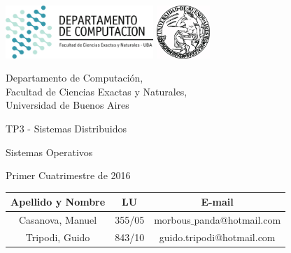 \documentclass[a4paper,10pt,twoside]{article}
\begin{document}


\thispagestyle{caratula}

\begin{center}

\includegraphics[height=2cm]{DC.png} 
\hfill
\includegraphics[height=2cm]{UBA.jpg} 

\vspace{2cm}

Departamento de Computación,\\
Facultad de Ciencias Exactas y Naturales,\\
Universidad de Buenos Aires

\vspace{4cm}

\begin{Huge}
TP3 - Sistemas Distribuidos
\end{Huge}

\vspace{0.5cm}

\begin{Large}
Sistemas Operativos
\end{Large}

\vspace{1cm}

Primer Cuatrimestre de 2016

\vspace{4cm}

\vspace{0.5cm}

\begin{tabular}{|c|c|c|}
\hline
Apellido y Nombre & LU & E-mail\\
\hline
Casanova, Manuel			& 355/05 & morbous$\_$panda@hotmail.com\\
Tripodi, Guido			& 843/10 & guido.tripodi@hotmail.com\\
\hline
\end{tabular}

\end{center}
\end{document}
